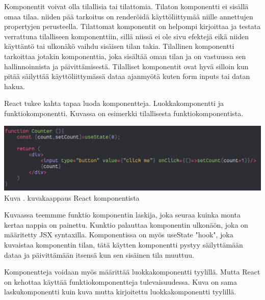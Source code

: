 
Komponentit voivat olla tilallisia tai tilattomia. 
%
Tilaton komponentti ei sisällä omaa tilaa. 
niiden pää tarkoitus on renderöidä käyttöliittymää niille annettujen propertyjen perusteella.
Tilattomat komponentit on helpompi kirjoittaa ja testata verrattuna tilalliseen komponenttiin, 
sillä niissä ei ole sivu efektejä eikä niiden käyttäntö tai ulkonäkö vaihdu sisäisen tilan takia.
%
Tilallinen komponentti tarkoittaa jotakin komponenttia, joka sisältää oman tilan ja on vastuussa sen hallinnoinnista ja päivittämisestä.
Tilalliset komponentit ovat hyvä silloin kun pitää säilyttää käyttöliittymässä dataa ajanmyötä kuten form inputs tai datan hakua.
\medskip


React tukee kahta tapaa luoda komponentteja. Luokkakomponentti ja funktiokomponentti.\citemissing
Kuvassa \nextImageCount {} on esimerkki tilallisesta funktiokomponentista.
\bigskip


\includegraphics[width=15cm]{src/public/oppar/function_component.png}\\
Kuva \getImgCount{}. kuvakaappaus React komponentista
\medskip

Kuvaassa teemmme funktio komponentin laskija, joka seuraa kuinka monta kertaa nappia on painettu.
Kunktio palauttaa komponentin ulkonäön, joka on määritetty JSX syntaxilla.
Komponentissa on myös useState "hook"{}, joka kuvaistaa komponentin tilan, tätä käytten komponentti pystyy säilyttämään dataa ja päivittämään itsensä kun sen sisäinen tila muuttuu.
\medskip

Komponentteja voidaan myös määrittää luokkakomponentti tyylillä. Mutta React on kehottaa käyttää funktiokomponentteja tulevaisuudessa. 
Kuva \nextImageCount {} on sama laskukomponentti kuin kuva \theimgCounter{} mutta kirjoitettu luokkakomponentti tyylillä. 
\medskip
\bigskip


